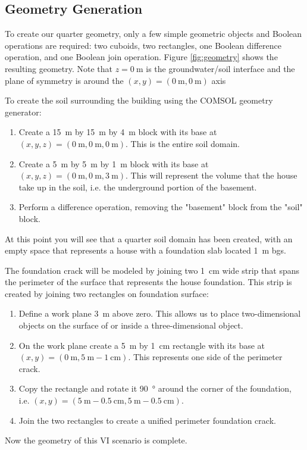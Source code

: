 \clearpage
\begin{appendices}

  \section{Geometry Generation}

  To create our quarter geometry, only a few simple geometric objects and Boolean operations are required: two cuboids, two rectangles, one Boolean difference operation, and one Boolean join operation.
  Figure \ref{fig:geometry} shows the resulting geometry.
  Note that $z = \SI{0}{\metre}$ is the groundwater/soil interface and the plane of symmetry is around the $(x, y) = (\SI{0}{\metre},\SI{0}{\metre})$ axis\par

  To create the soil surrounding the building using the COMSOL geometry generator:
  \begin{enumerate}
    \item Create a \SI{15}{\metre} by \SI{15}{\metre} by \SI{4}{\metre} block with its base at $(x, y, z) = (\SI{0}{\metre},\SI{0}{\metre},\SI{0}{\metre})$. This is the entire soil domain.
    \item Create a \SI{5}{\metre} by \SI{5}{\metre} by \SI{1}{\metre} block with its base at $(x, y, z) = (\SI{0}{\metre},\SI{0}{\metre},\SI{3}{\metre})$. This will represent the volume that the house take up in the soil, i.e. the underground portion of the basement.
    \item Perform a difference operation, removing the "basement" block from the "soil" block.
  \end{enumerate}
  At this point you will see that a quarter soil domain has been created, with an empty space that represents a house with a foundation slab located \SI{1}{\metre} bgs.\par

  The foundation crack will be modeled by joining two  \SI{1}{\centi\metre} wide strip that spans the perimeter of the surface that represents the house foundation.
  This strip is created by joining two rectangles on foundation surface:
  \begin{enumerate}
    \item Define a work plane \SI{3}{\metre} above zero. This allows us to place two-dimensional objects on the surface of or inside a three-dimensional object.
    \item On the work plane create a \SI{5}{\metre} by \SI{1}{\centi\metre} rectangle with its base at $(x, y) = (\SI{0}{\metre},\SI{5}{\metre} - \SI{1}{\centi\metre})$. This represents one side of the perimeter crack.
    \item Copy the rectangle and rotate it \SI{90}{\degree} around the corner of the foundation, i.e. $(x, y) = (\SI{5}{\metre} - \SI{0.5}{\centi\metre},\SI{5}{\metre} - \SI{0.5}{\centi\metre})$.
    \item Join the two rectangles to create a unified perimeter foundation crack.
  \end{enumerate}
  Now the geometry of this VI scenario is complete.\par


\end{appendices}
